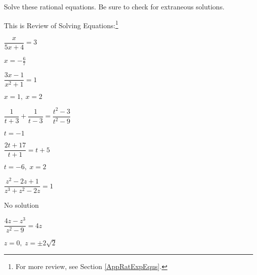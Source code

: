 \documentclass{ximera}
\begin{document}
	\author{Stitz-Zeager}





\begin{problem}
  Solve these rational equations.  Be sure to check for extraneous solutions.

  This is Review of Solving Equations:\footnote{For more review, see Section \ref{AppRatExpEqus}.} 

\begin{question}
$\dfrac{x}{5x + 4} = 3$
\begin{solution}
$x = -\frac{6}{7}$
\end{solution}

\end{question}

\begin{question}
$\dfrac{3x - 1}{x^{2} + 1} = 1$

\begin{solution}
$x = 1, \; x = 2$
\end{solution}

\end{question}

\begin{question}
$\dfrac{1}{t + 3} + \dfrac{1}{t - 3} = \dfrac{t^{2} - 3}{t^{2} - 9}$
\begin{solution}
$t = -1$

\end{solution}

\end{question}

\begin{question}
$\dfrac{2t + 17}{t + 1} = t + 5$

\begin{solution}
$t = -6, \; x = 2$
\end{solution}

\end{question}

\begin{question}
$\dfrac{z^{2} - 2z + 1}{z^{3} + z^{2} - 2z} = 1$
\begin{solution}
No solution
\end{solution}

\end{question}

\begin{question}
$\dfrac{4z- z^3}{z^{2} - 9} = 4z$  

\begin{solution}
$z = 0, \; z = \pm 2\sqrt{2}$

\end{solution}

\end{question}

\end{problem}
\end{document}
